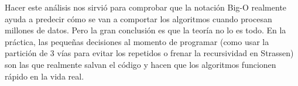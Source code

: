Hacer este análisis nos sirvió para comprobar que la notación Big-O realmente ayuda a predecir cómo se van a comportar los algoritmos cuando procesan millones de datos. Pero la gran conclusión es que la teoría no lo es todo. En la práctica, las pequeñas decisiones al momento de programar (como usar la partición de 3 vías para evitar los repetidos o frenar la recursividad en Strassen) son las que realmente salvan el código y hacen que los algoritmos funcionen rápido en la vida real.